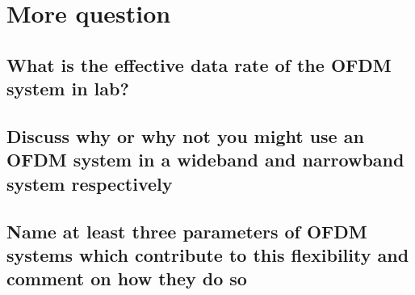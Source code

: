 \documentclass[frenchb, oneside, headings=normal]{scrartcl}
\begin{document}
\section{More question}

\subsection{What is the effective data rate of the OFDM system in lab?}

\subsection{Discuss why or why not you might use an OFDM system in a wideband and narrowband system respectively}

\subsection{Name at least three parameters of OFDM systems which contribute to this flexibility and comment on how they do so}
\end{document}
